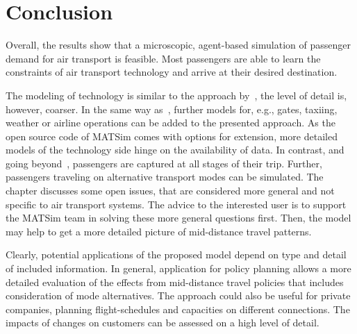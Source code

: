 \section{Conclusion}

Overall, the results show that a microscopic, agent-based simulation of passenger demand for air transport is feasible. 
Most passengers are able to learn the constraints of air transport technology and arrive at their desired destination.

The modeling of technology is similar to the approach by~\citet{ClarkeEtAl2007AirNetworkSim}, the level of detail is, however, coarser. 
In the same way as~\citet{ClarkeEtAl2007AirNetworkSim}, further models for, e.g., gates, taxiing, weather or airline operations can be added to the presented approach. 
As the open source code of MATSim comes with options for extension, more detailed models of the technology side hinge on the availability of data. 
In contrast, and going beyond~\citet{ClarkeEtAl2007AirNetworkSim}, passengers are captured at all stages of their trip. 
Further, passengers traveling on alternative transport modes can be simulated. 
The chapter discusses some open issues, that are considered more general and not specific to air transport systems. 
The advice to the interested user is to support the MATSim team in solving these more general questions first.  
Then, the model may help to get a more detailed picture of mid-distance travel patterns.

Clearly, potential applications of the proposed model depend on type and detail of included information. 
In general, application for policy planning allows a more detailed evaluation of the effects from mid-distance travel policies that includes consideration of mode alternatives. 
The approach could also be useful for private companies, planning flight-schedules and capacities on different connections. 
The impacts of changes on customers can be assessed on a high level of detail. 

